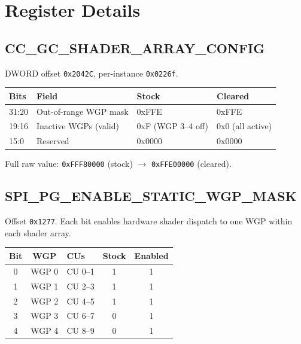 \documentclass[11pt,twocolumn]{article}
\begin{document}
\appendix

\section{Register Details}

\subsection*{CC\_GC\_SHADER\_ARRAY\_CONFIG}

DWORD offset \texttt{0x2042C}, per-instance \texttt{0x0226f}.

\begin{table}[H]
\centering
\begin{tabular}{@{}llll@{}}
\toprule
\textbf{Bits} & \textbf{Field} & \textbf{Stock} & \textbf{Cleared} \\
\midrule
31:20 & Out-of-range WGP mask & 0xFFE & 0xFFE \\
19:16 & Inactive WGPs (valid) & 0xF (WGP 3--4 off) & 0x0 (all active) \\
15:0 & Reserved & 0x0000 & 0x0000 \\
\bottomrule
\end{tabular}
\end{table}

Full raw value: \texttt{0xFFF80000} (stock) $\rightarrow$ \texttt{0xFFE00000} (cleared).

\subsection*{SPI\_PG\_ENABLE\_STATIC\_WGP\_MASK}

Offset \texttt{0x1277}. Each bit enables hardware shader dispatch to one WGP within each shader array.

\begin{table}[H]
\centering
\begin{tabular}{@{}cclcc@{}}
\toprule
\textbf{Bit} & \textbf{WGP} & \textbf{CUs} & \textbf{Stock} & \textbf{Enabled} \\
\midrule
0 & WGP 0 & CU 0--1 & 1 & 1 \\
1 & WGP 1 & CU 2--3 & 1 & 1 \\
2 & WGP 2 & CU 4--5 & 1 & 1 \\
3 & WGP 3 & CU 6--7 & 0 & 1 \\
4 & WGP 4 & CU 8--9 & 0 & 1 \\
\bottomrule
\end{tabular}
\end{table}
\end{document}
